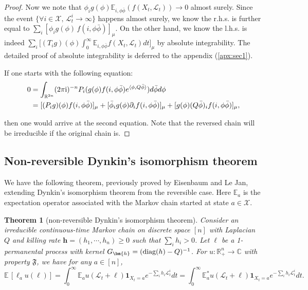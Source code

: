 \documentclass[a4paper, 11pt]{article}
\newcommand{\E}{\mathbb{E}}
\newcommand{\ind}{\mathbf{1}}
\newcommand{\Ell}{\mathcal{L}}
\newcommand{\diag}{\textnormal{diag}}
\newcommand{\compi}{\textnormal{i}}
\newcommand{\orth}{{\mathbb{R}^{2n}}}
\newcommand{\orthp}{{\mathbb{R}_+^n}}
\newtheorem{thm}{Theorem}[section]
\begin{document}
\begin{proof}
Now we note that $\phi_ig(\phi)\E_{i,\phi\bar{\phi}}(f(X_t,\Ell_t))\rightarrow 0$ almost surely. Since the event $\{\forall i\in\mathcal{X},\,\Ell_t^i \rightarrow \infty\}$ happens almost surely, we know the r.h.s. is further equal to $\sum_i[\phi_i g(\phi)\,f(i,\phi\bar{\phi})]_\mu$. On the other hand, we know the l.h.s. is indeed $\sum_i\big[(T_ig)(\phi)\int_0^\infty \E_{i,\phi\bar{\phi}}f(X_t, \Ell_t)dt\big]_\mu$ by absolute integrability. The detailed proof of absolute integrability is deferred to the appendix (\cref{apx:sec1}).

If one starts with the following equation:
\begin{equation*}
\begin{aligned}
0
&=\int_\orth (2 \pi \compi)^{-n} P_i(g(\phi)f(i,\phi\bar{\phi})e^{\langle \phi,Q\bar{\phi}\rangle})d \bar{\phi} d \phi \\
&= [(P_ig)(\phi)f(i,\phi\bar{\phi})]_\mu
+[\bar{\phi}_i g(\phi)\partial_if(i,\phi\bar{\phi})]_\mu
+[g(\phi)(Q\bar{\phi})_if(i,\phi\bar{\phi})]_\mu,
\end{aligned}
\end{equation*}

then one would arrive at the second equation. Note that the reversed chain will be irreducible if the original chain is.
\end{proof}

\subsection{Non-reversible Dynkin's isomorphism theorem}

We have the following theorem, previously proved by Eisenbaum\cite{eisenbaum13} and Le Jan\cite{lejan08}, extending Dynkin's isomorphism theorem from the reversible case\cite{sznitman12}. Here $\E_a$ is the expectation operator associated with the Markov chain started at state $a\in\mathcal{X}$.

\vspace{.3em} \begin{thm}[non-reversible Dynkin's isomorphism theorem]
\label{thm:dynkin}
Consider an irreducible continuous-time Markov chain on discrete space $[n]$ with Laplacian $Q$ and killing rate $\bm{h}=(h_1, \cdots, h_n)\geq 0$ such that $\sum_i h_i>0$. Let $\ell$ be a 1-permanental process with kernel $G_{\bm{h}}=(\diag(h)-Q)^{-1}$. For $ u:\orthp\rightarrow \mathbb{C}$ with property $\mathfrak{F}$, we have for any $a\in[n]$,
\[\E\,[\ell_a u(\ell)]=\int_0^\infty \E_a u(\Ell_t+\ell)\ind_{X_t=a}e^{-\sum_i h_i\Ell_t^i}dt=\int_0^\infty \E_a^* u(\Ell_t+\ell)\ind_{X_t=a}e^{-\sum_i h_i\Ell_t^i}dt. \]

\end{thm}
\end{document}
